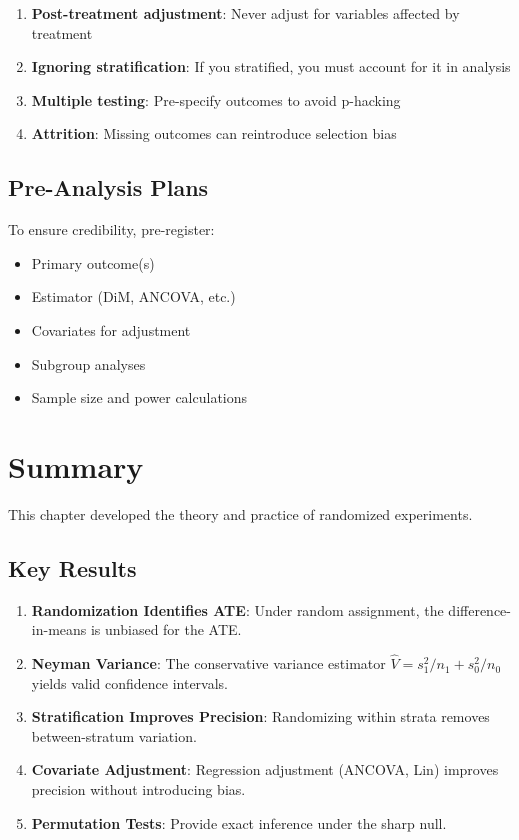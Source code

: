 \begin{enumerate}
    \item \textbf{Post-treatment adjustment}: Never adjust for variables affected by treatment
    \item \textbf{Ignoring stratification}: If you stratified, you must account for it in analysis
    \item \textbf{Multiple testing}: Pre-specify outcomes to avoid p-hacking
    \item \textbf{Attrition}: Missing outcomes can reintroduce selection bias
\end{enumerate}

\subsection{Pre-Analysis Plans}

To ensure credibility, pre-register:
\begin{itemize}
    \item Primary outcome(s)
    \item Estimator (DiM, ANCOVA, etc.)
    \item Covariates for adjustment
    \item Subgroup analyses
    \item Sample size and power calculations
\end{itemize}


\section{Summary}
\label{sec:rct_summary}

This chapter developed the theory and practice of randomized experiments.

\subsection{Key Results}

\begin{enumerate}
    \item \textbf{Randomization Identifies ATE}: Under random assignment, the difference-in-means is unbiased for the ATE.

    \item \textbf{Neyman Variance}: The conservative variance estimator $\hat{V} = s_1^2/n_1 + s_0^2/n_0$ yields valid confidence intervals.

    \item \textbf{Stratification Improves Precision}: Randomizing within strata removes between-stratum variation.

    \item \textbf{Covariate Adjustment}: Regression adjustment (ANCOVA, Lin) improves precision without introducing bias.

    \item \textbf{Permutation Tests}: Provide exact inference under the sharp null.
\end{enumerate}

